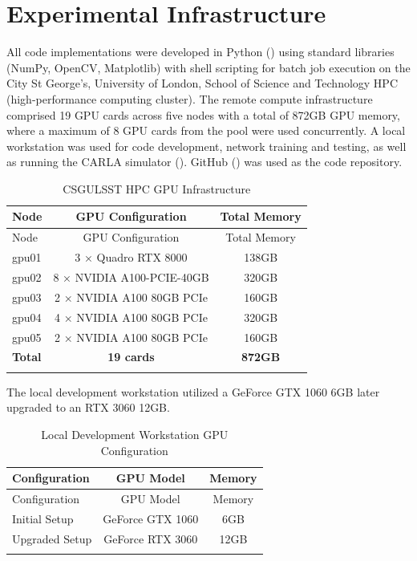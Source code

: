 
\section{Experimental Infrastructure}
\label{methods:hardware}

All code implementations were developed in Python (\cite{python}) using standard libraries (NumPy, OpenCV, Matplotlib) with shell scripting for batch job execution on the City St George's, University of London, School of Science and Technology HPC (high-performance computing cluster). The remote compute infrastructure comprised 19 GPU cards across five nodes with a total of 872GB GPU memory, where a maximum of 8 GPU cards from the pool were used concurrently. A local workstation was used for code development, network training and testing, as  well as running the CARLA simulator (\cite{dosovitskiy17}). GitHub (\cite{github}) was used as the code repository.

\begin{longtable}{@{}lcc@{}}
\toprule
Node & GPU Configuration & Total Memory \\
\midrule
\endfirsthead
\toprule
Node & GPU Configuration & Total Memory \\
\midrule
\endhead
gpu01 & 3 × Quadro RTX 8000 & 138GB \\
gpu02 & 8 × NVIDIA A100-PCIE-40GB & 320GB \\
gpu03 & 2 × NVIDIA A100 80GB PCIe & 160GB \\
gpu04 & 4 × NVIDIA A100 80GB PCIe & 320GB \\
gpu05 & 2 × NVIDIA A100 80GB PCIe & 160GB \\
\midrule
\textbf{Total} & \textbf{19 cards} & \textbf{872GB} \\
\bottomrule
\caption{CSGULSST HPC GPU Infrastructure}
\label{tab:hpc_hardware}
\end{longtable}

The local development workstation utilized a GeForce GTX 1060 6GB later upgraded to an RTX 3060 12GB.

\begin{longtable}{@{}lcc@{}}
\toprule
Configuration & GPU Model & Memory \\
\midrule
\endfirsthead
\toprule
Configuration & GPU Model & Memory \\
\midrule
\endhead
Initial Setup & GeForce GTX 1060 & 6GB \\
Upgraded Setup & GeForce RTX 3060 & 12GB \\
\bottomrule
\caption{Local Development Workstation GPU Configuration}
\label{tab:local_hardware}
\end{longtable}

